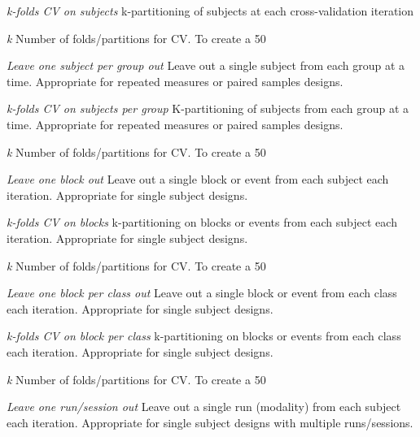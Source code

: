 \textit{k-folds CV on subjects}
k-partitioning of subjects at each cross-validation iteration


\textit{k}
Number of folds/partitions for CV. To create a 50%


\textit{Leave one subject per group out}
Leave out a single subject from each group at a time. Appropriate for repeated measures or paired samples designs.


\textit{k-folds CV on subjects per group}
K-partitioning of subjects from each group at a time. Appropriate for repeated measures or paired samples designs.


\textit{k}
Number of folds/partitions for CV. To create a 50%


\textit{Leave one block out}
Leave out a single block or event from each subject each iteration. Appropriate for single subject designs.


\textit{k-folds CV on blocks}
k-partitioning on blocks or events from each subject each iteration. Appropriate for single subject designs.


\textit{k}
Number of folds/partitions for CV. To create a 50%


\textit{Leave one block per class out}
Leave out a single block or event from each class each iteration. Appropriate for single subject designs.


\textit{k-folds CV on block per class}
k-partitioning on blocks or events from each class each iteration. Appropriate for single subject designs.


\textit{k}
Number of folds/partitions for CV. To create a 50%


\textit{Leave one run/session out}
Leave out a single run (modality) from each subject each iteration. Appropriate for single subject designs with multiple runs/sessions.


